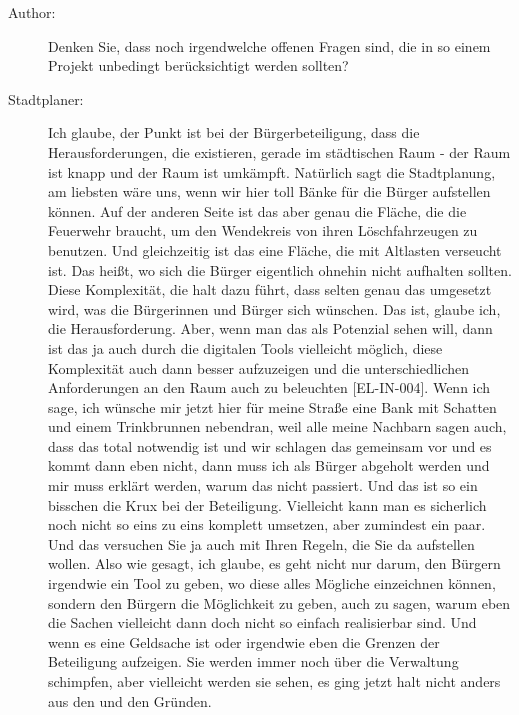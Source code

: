 \begin{description}
\item[Author:] Denken Sie, dass noch irgendwelche offenen Fragen sind, die in so einem Projekt unbedingt berücksichtigt werden sollten?
\item[Stadtplaner:] Ich glaube, der Punkt ist bei der Bürgerbeteiligung, dass die Herausforderungen, die existieren, gerade im städtischen Raum - der Raum ist knapp und der Raum ist umkämpft. Natürlich sagt die Stadtplanung, am liebsten wäre uns, wenn wir hier toll Bänke für die Bürger aufstellen können. Auf der anderen Seite ist das aber genau die Fläche, die die Feuerwehr braucht, um den Wendekreis von ihren Löschfahrzeugen zu benutzen. Und gleichzeitig ist das eine Fläche, die mit Altlasten verseucht ist. Das heißt, wo sich die Bürger eigentlich ohnehin nicht aufhalten sollten. Diese Komplexität, die halt dazu führt, dass selten genau das umgesetzt wird, was die Bürgerinnen und Bürger sich wünschen. Das ist, glaube ich, die Herausforderung. Aber, wenn man das als Potenzial sehen will, dann ist das ja auch durch die digitalen Tools vielleicht möglich, diese Komplexität auch dann besser aufzuzeigen und die unterschiedlichen Anforderungen an den Raum auch zu beleuchten [EL-IN-004]. Wenn ich sage, ich wünsche mir jetzt hier für meine Straße eine Bank mit Schatten und einem Trinkbrunnen nebendran, weil alle meine Nachbarn sagen auch, dass das total notwendig ist und wir schlagen das gemeinsam vor und es kommt dann eben nicht, dann muss ich als Bürger abgeholt werden und mir muss erklärt werden, warum das nicht passiert. Und das ist so ein bisschen die Krux bei der Beteiligung. Vielleicht kann man es sicherlich noch nicht so eins zu eins komplett umsetzen, aber zumindest ein paar. Und das versuchen Sie ja auch mit Ihren Regeln, die Sie da aufstellen wollen. Also wie gesagt, ich glaube, es geht nicht nur darum, den Bürgern irgendwie ein Tool zu geben, wo diese alles Mögliche einzeichnen können, sondern den Bürgern die Möglichkeit zu geben, auch zu sagen, warum eben die Sachen vielleicht dann doch nicht so einfach realisierbar sind. Und wenn es eine Geldsache ist oder irgendwie eben die Grenzen der Beteiligung aufzeigen. Sie werden immer noch über die Verwaltung schimpfen, aber vielleicht werden sie sehen, es ging jetzt halt nicht anders aus den und den Gründen.
\end{description}